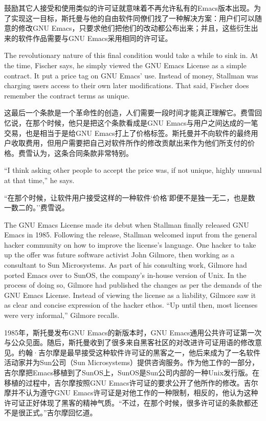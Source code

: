\ifdefined\chs
鼓励其它人接受和使用类似的许可证就意味着不再允许私有的Emacs版本出现。为了实现这一目标，斯托曼与他的自由软件同僚们找了一种解决方案：用户们可以随意的修改GNU Emacs，只要求他们把他们的改动都公布出来；并且，这些衍生出来的软件作品需要与GNU Emacs采用相同的许可证。
\fi

\ifdefined\eng
The revolutionary nature of this final condition would take a while to sink in. At the time, Fischer says, he simply viewed the GNU Emacs License as a simple contract. It put a price tag on GNU Emacs' use. Instead of money, Stallman was charging users access to their own later modifications. That said, Fischer does remember the contract terms as unique.
\fi

\ifdefined\chs
这最后一个条款是一个革命性的创造，人们需要一段时间才能真正理解它。费雪回忆说，在那个时候，他只是把这个条款看成是GNU Emacs与用户之间达成的一笔交易，也是相当于是给GNU Emacs打上了价格标签。斯托曼并不向软件的最终用户收取费用，但用户需要把自己对软件所作的修改贡献出来作为他们所支付的价格。费雪认为，这条合同条款非常特别。
\fi

\ifdefined\eng
``I think asking other people to accept the price was, if not unique, highly unusual at that time,'' he says.
\fi

\ifdefined\chs
``在那个时候，让软件用户接受这样的一种软件`价格'即便不是独一无二，也是数一数二的。''费雪说。
\fi

\ifdefined\eng
The GNU Emacs License made its debut when Stallman finally released GNU Emacs in 1985. Following the release, Stallman welcomed input from the general hacker community on how to improve the license's language. One hacker to take up the offer was future software activist John Gilmore, then working as a consultant to Sun Microsystems. As part of his consulting work, Gilmore had ported Emacs over to SunOS, the company's in-house version of Unix. In the process of doing so, Gilmore had published the changes as per the demands of the GNU Emacs License. Instead of viewing the license as a liability, Gilmore saw it as clear and concise expression of the hacker ethos. ``Up until then, most licenses were very informal,'' Gilmore recalls.
\fi

\ifdefined\chs
1985年，斯托曼发布GNU Emacs的新版本时，GNU Emacs通用公共许可证第一次与公众见面。随后，斯托曼收到了很多来自黑客社区的对改进许可证用语的修改意见。约翰·吉尔摩是最早接受这种软件许可证的黑客之一，他后来成为了一名软件活动家并为Sun公司（Sun Microsystems）提供咨询服务。作为他工作的一部分，吉尔摩把Emacs移植到了SunOS上，SunOS是Sun公司内部的一种Unix发行版。在移植的过程中，吉尔摩按照GNU Emacs许可证的要求公开了他所作的修改。吉尔摩并不认为遵守GNU Emacs许可证是对他工作的一种限制，相反的，他认为这种许可证正好体现了黑客的精神气质。``不过，在那个时候，很多许可证的条款都还不是很正式。''吉尔摩回忆道。
\fi

